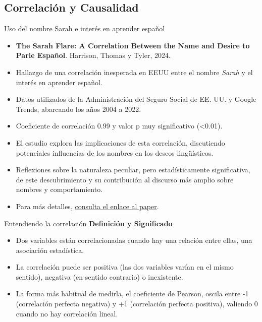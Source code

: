 ﻿\documentclass{beamer}
\begin{document}
\subsection{Correlación y Causalidad}

\begin{frame}{Uso del nombre Sarah e interés en aprender español}
  \begin{itemize}
    \item  \textbf{The Sarah Flare: A Correlation Between the Name and Desire to
Parle Español}. Harrison, Thomas y Tyler, 2024.
    \item Hallazgo de una correlación inesperada en EEUU entre el nombre \textit{Sarah} y el interés en aprender español.
    \item Datos utilizados de la Administración del Seguro Social de EE. UU. y Google Trends, abarcando los años 2004 a 2022.
    \item Coeficiente de correlación 0.99 y valor p muy significativo (\textless{}0.01).
    \item El estudio explora las implicaciones de esta correlación, discutiendo potenciales influencias de los nombres en los deseos lingüísticos.
    \item Reflexiones sobre la naturaleza peculiar, pero estadísticamente significativa, de este descubrimiento y su contribución al discurso más amplio sobre nombres y comportamiento.
    \item Para más detalles, \href{https://tylervigen.com/spurious/research-papers/4240_the-sarah-flare-a-correlation-between-the-name-and-desire-to-parle-espaol.pdf}{consulta el enlace al paper}.
    \end{itemize}
\end{frame}
\begin{frame}{Entendiendo la correlación}
    \textbf{Definición y Significado}
    \begin{itemize}
        \item Dos variables están correlacionadas cuando hay una relación entre ellas, una asociación estadística.
        \item La correlación puede ser positiva (las dos variables varían en el mismo sentido), negativa (en sentido contrario) o inexistente.
        \item La forma más habitual de medirla, el coeficiente de Pearson, oscila entre -1 (correlación perfecta negativa) y +1 (correlación perfecta positiva), valiendo 0 cuando no hay correlación lineal.
    \end{itemize}
\end{frame}
\end{document}
